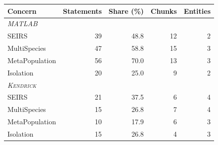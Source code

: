\setlength{\tabcolsep}{3pt}
\begin{tabular}{|l|r|r|r|r|}
\hline
Concern & Statements & Share (\%) & Chunks & Entities \\
\hline
\multicolumn{5}{|l|}{\emph{MATLAB}} \\
\hline
SEIRS & 39 & 48.8 & 12 & 2 \\
MultiSpecies & 47 & 58.8 & 15 & 3 \\
MetaPopulation & 56 & 70.0 & 13 & 3 \\
Isolation & 20 & 25.0 & 9 & 2 \\
\hline
\multicolumn{5}{|l|}{\emph{\textsc{Kendrick}}} \\
\hline
SEIRS & 21 & 37.5 & 6 & 4 \\
MultiSpecies & 15 & 26.8 & 7 & 4 \\
MetaPopulation & 10 & 17.9 & 6 & 3 \\
Isolation & 15 & 26.8 & 4 & 3 \\
\hline
\end{tabular}
